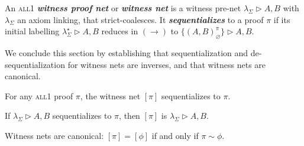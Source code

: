 \documentclass[UKenglish]{lipics-v2019}
\newcommand\defn[1]{\textit{\textbf{#1}}}
\newcommand\all{\textsc{all}}
\newcommand\+{+}
\renewcommand\*{\times}
\newcommand\net[3]{#1\triangleright #2,#3}
\newcommand\link[3][\sigma]{(#2,#3)_{#1}}
\newcommand\scoal{\rightarrow} %
\begin{document}
\begin{definition}
An \all{\textnormal 1} \defn{witness proof net} or \defn{witness net} is a witness pre-net $\net{\lambda_\Sigma}AB$ with $\lambda_\Sigma$ an axiom linking, that strict-coalesces. It \defn{sequentializes} to a proof $\pi$ if its initial labelling $\net{\lambda_\Sigma^\star}AB$ reduces in $(\scoal)$ to $\net{\{\link[\varnothing]AB^\pi\}}AB$.
\end{definition}


We conclude this section by establishing that sequentialization and de-sequentialization for witness nets are inverses, and that witness nets are canonical.


\begin{theorem}
\label{thm:proof->net->proof}
For any \all{\textnormal 1} proof $\pi$, the witness net $[\pi]$ sequentializes to $\pi$. 
\end{theorem}


\begin{theorem}
\label{thm:net->proof->net}
If $\net{\lambda_\Sigma}AB$ sequentializes to $\pi$, then $[\pi]$ is $\net{\lambda_\Sigma}AB$. 
\end{theorem}


\begin{theorem}
\label{thm:canonical}
Witness nets are canonical: $[\pi]=[\phi]$ if and only if $\pi\sim\phi$.
\end{theorem}
\end{document}
